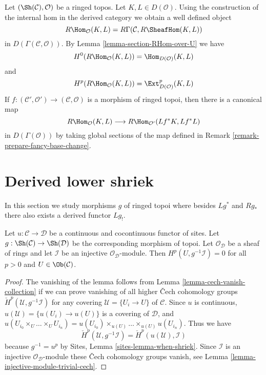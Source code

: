 \noindent
Let $(\Sh(\mathcal{C}), \mathcal{O})$ be a ringed topos.
Let $K, L \in D(\mathcal{O})$.
Using the construction of the internal hom in the derived category we
obtain a well defined object
$$
R\Hom_\mathcal{O}(K, L) = R\Gamma(\mathcal{C}, R\SheafHom(K, L))
$$
in $D(\Gamma(\mathcal{C}, \mathcal{O}))$. By
Lemma \ref{lemma-section-RHom-over-U} we have
$$
H^0(R\Hom_\mathcal{O}(K, L)) = \Hom_{D(\mathcal{O})}(K, L)
$$
and
$$
H^p(R\Hom_\mathcal{O}(K, L)) = \Ext_{D(\mathcal{O})}^p(K, L)
$$
If $f : (\mathcal{C}', \mathcal{O}') \to (\mathcal{C}, \mathcal{O})$
is a morphism of ringed topoi, then there is a canonical map
$$
R\Hom_\mathcal{O}(K, L) \longrightarrow R\Hom_{\mathcal{O}'}(Lf^*K, Lf^*L)
$$
in $D(\Gamma(\mathcal{O}))$ by taking global sections of the map
defined in Remark \ref{remark-prepare-fancy-base-change}.









\section{Derived lower shriek}
\label{section-derived-lower-shriek}

\noindent
In this section we study morphisms $g$ of ringed topoi where besides
$Lg^*$ and $Rg_*$ there also exists a derived functor $Lg_!$.

\begin{lemma}
\label{lemma-pullback-injective-pre-limp}
Let $u : \mathcal{C} \to \mathcal{D}$ be a continuous and cocontinuous
functor of sites. Let $g : \Sh(\mathcal{C}) \to \Sh(\mathcal{D})$
be the corresponding morphism of topoi. Let $\mathcal{O}_\mathcal{D}$
be a sheaf of rings and let $\mathcal{I}$ be an injective
$\mathcal{O}_\mathcal{D}$-module. Then
$H^p(U, g^{-1}\mathcal{I}) = 0$ for all $p > 0$ and $U \in \Ob(\mathcal{C})$.
\end{lemma}

\begin{proof}
The vanishing of the lemma follows from
Lemma \ref{lemma-cech-vanish-collection}
if we can prove vanishing of all higher
{\v C}ech cohomology groups
$\check H^p(\mathcal{U}, g^{-1}\mathcal{I})$
for any covering $\mathcal{U} = \{U_i \to U\}$ of $\mathcal{C}$.
Since $u$ is continuous, $u(\mathcal{U}) = \{u(U_i) \to u(U)\}$
is a covering of $\mathcal{D}$, and
$u(U_{i_0} \times_U \ldots \times_U U_{i_n}) =
u(U_{i_0}) \times_{u(U)} \ldots \times_{u(U)} u(U_{i_n})$.
Thus we have
$$
\check H^p(\mathcal{U}, g^{-1}\mathcal{I}) =
\check H^p(u(\mathcal{U}), \mathcal{I})
$$
because $g^{-1} = u^p$ by Sites, Lemma \ref{sites-lemma-when-shriek}.
Since $\mathcal{I}$ is an injective
$\mathcal{O}_\mathcal{D}$-module these {\v C}ech cohomology groups vanish, see
Lemma \ref{lemma-injective-module-trivial-cech}.
\end{proof}

